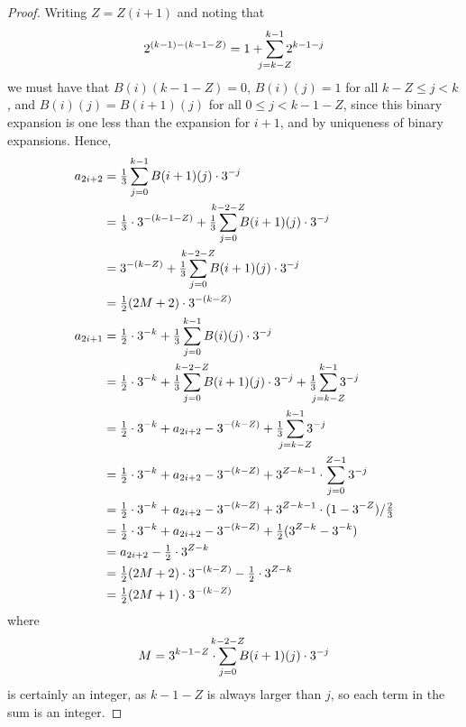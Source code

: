 \documentclass[fleqn,a4paper,11pt]{article}
\begin{document}
\begin{proof}
  Writing \(Z = Z(i + 1)\) and noting that
  \begin{equation*}
   2^{(k - 1) - (k - 1 - Z)}
    = 1 + \sum_{\mathclap{j = k - Z}}^{k - 1}
               2^{k - 1 - j}
  \end{equation*}
  we must have that \(B(i)(k - 1 - Z) = 0\),
  \(B(i)(j) = 1\) for all \(k - Z \le j < k\), and \(B(i)(j) = B(i + 1)(j)\) for
  all \(0 \le j < k - 1 - Z\), since this binary expansion is one less than the
  expansion for \(i + 1\), and by uniqueness of binary expansions. Hence,
  \begin{align*}
   a_{2i + 2}
    &= \tfrac 13 \sum_{j = 0}^{k - 1} B(i + 1)(j) \cdot 3^{-j} \\
    &= \tfrac 13 \cdot 3^{-(k - 1 - Z)}
     + \tfrac 13 \sum_{j = 0}^{\mathclap{k - 2 - Z}} B(i + 1)(j) \cdot 3^{-j} \\
    &= 3^{-(k - Z)}
     + \tfrac 13 \sum_{j = 0}^{\mathclap{k - 2 - Z}} B(i + 1)(j) \cdot 3^{-j} \\
    &= \tfrac 12 (2M + 2) \cdot 3^{-(k - Z)} \\
   a_{2i + 1}
    &= \tfrac 12 \cdot 3^{-k}
     + \tfrac 13 \sum_{j = 0}^{k - 1} B(i)(j) \cdot 3^{-j} \\
    &= \tfrac 12 \cdot 3^{-k}
     + \tfrac 13 \sum_{j = 0}^{\mathclap{k - 2 - Z}} B(i + 1)(j) \cdot 3^{-j}
     + \tfrac 13 \sum_{\mathclap{j = k - Z}}^{k - 1} 3^{-j} \\
    &= \tfrac 12 \cdot 3^{-k} + a_{2i + 2} - 3^{-(k - Z)}
     + \tfrac 13 \sum_{\mathclap{j = k - Z}}^{k - 1} 3^{-j} \\
    &= \tfrac 12 \cdot 3^{-k} + a_{2i + 2} - 3^{-(k - Z)}
     + 3^{Z - k - 1} \cdot \sum_{\mathclap{j = 0}}^{Z - 1} 3^{-j} \\
    &= \tfrac 12 \cdot 3^{-k} + a_{2i + 2} - 3^{-(k - Z)}
     + 3^{Z - k - 1} \cdot (1 - 3^{-Z})/\tfrac 23 \\
    &= \tfrac 12 \cdot 3^{-k} + a_{2i + 2} - 3^{-(k - Z)}
     + \tfrac 12 (3^{Z - k} - 3^{-k}) \\
    &= a_{2i + 2} - \tfrac 12 \cdot 3^{Z - k} \\
    &= \tfrac 12 (2M + 2) \cdot 3^{-(k - Z)} - \tfrac 12 \cdot 3^{Z - k} \\
    &= \tfrac 12 (2M + 1) \cdot 3^{-(k - Z)}
  \end{align*}
  where
  \begin{align*}
   M = 3^{k - 1 - Z} \cdot
        \sum_{j = 0}^{\mathclap{k - 2 - Z}} B(i + 1)(j) \cdot 3^{-j}
  \end{align*}
  is certainly an integer, as \(k - 1 - Z\) is always larger than \(j\), so each
  term in the sum is an integer.


\end{proof}
\end{document}

